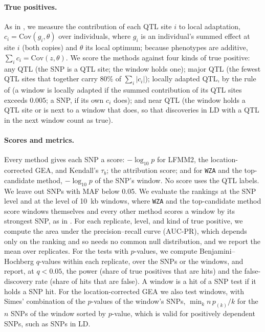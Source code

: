 \documentclass[]{article}
\begin{document}
\paragraph{True positives.}
As in \citet{booker_structure_2024},
we measure the contribution of each QTL site $i$ to local adaptation,
$c_i = \mathrm{Cov}(g_i, \theta)$ over individuals,
where $g_i$ is an individual's summed effect at site $i$ (both copies)
and $\theta$ its local optimum;
because phenotypes are additive, $\sum_i c_i = \mathrm{Cov}(z, \theta)$.
We score the methods against four kinds of true positive:
any QTL (the SNP is a QTL site; the window holds one);
major QTL (the fewest QTL sites that together carry 80\% of $\sum_i |c_i|$);
locally adapted QTL, by the rule of \citet{booker_wza_2024}
(a window is locally adapted
if the summed contribution of its QTL sites exceeds 0.005;
a SNP, if its own $c_i$ does);
and near QTL (the window holds a QTL site or is next to a window that does,
so that discoveries in LD with a QTL in the next window count as true).

\paragraph{Scores and metrics.}
Every method gives each SNP a score:
$-\log_{10} p$ for LFMM2, the location-corrected GEA, and Kendall's $\tau_b$;
the attribution score;
and for \texttt{WZA} and the top-candidate method,
$-\log_{10} p$ of the SNP's window.
No score uses the QTL labels.
We leave out SNPs with MAF below 0.05.
We evaluate the rankings at the SNP level
and at the level of 10~kb windows,
where \texttt{WZA} and the top-candidate method score windows themselves
and every other method scores a window by its strongest SNP,
as in \citet{booker_wza_2024}.
For each replicate, level, and kind of true positive,
we compute the area under the precision--recall curve (AUC-PR),
which depends only on the ranking
and so needs no common null distribution,
and we report the mean over replicates.
For the tests with $p$-values,
we compute Benjamini--Hochberg $q$-values within each replicate,
over the SNPs or the windows,
and report, at $q < 0.05$,
the power (share of true positives that are hits)
and the false-discovery rate (share of hits that are false).
A window is a hit of a SNP test if it holds a SNP hit.
For the location-corrected GEA we also test windows,
with Simes' combination of the $p$-values of the window's SNPs,
$\min_k n\, p_{(k)} / k$ for the $n$ SNPs of the window
sorted by $p$-value,
which is valid for positively dependent SNPs, such as SNPs in LD.
\end{document}
